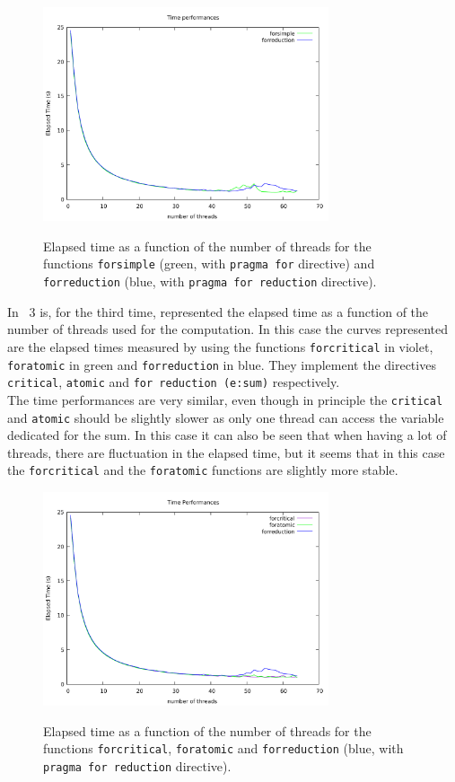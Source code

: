\documentclass[11pt,a4paper]{article}
\begin{document}
\begin{figure}[h!]
	\centering
	\includegraphics[width=0.75\textwidth]{../Images/Performance3.pdf}
	\label{fig:compare}
	\cprotect\caption{Elapsed time as a function of the number of threads for the functions \verb+forsimple+ (green, with \verb+pragma for+ directive) and \verb+forreduction+ (blue, with \verb+pragma for reduction+ directive).}
\end{figure}

\par In \figurename~3 is, for the third time, represented the elapsed time as a function of the number of threads used for the computation.
In this case the curves represented are the elapsed times measured by using the functions \verb+forcritical+ in violet, \verb+foratomic+ in green and \verb+forreduction+ in blue.
They implement the directives \verb+critical+, \verb+atomic+ and \verb+for reduction (e:sum)+ respectively.\\
The time performances are very similar, even though in principle the \verb+critical+ and \verb+atomic+ should be slightly slower as only one thread can access the variable dedicated for the sum.
In this case it can also be seen that when having a lot of threads, there are fluctuation in the elapsed time, but it seems that in this case the \verb+forcritical+ and the \verb+foratomic+ functions are slightly more stable.

\begin{figure}[h!]
	\centering
	\includegraphics[width=0.75\textwidth]{../Images/Performance2.pdf}
	\label{fig:race}
	\cprotect\caption{Elapsed time as a function of the number of threads for the functions \verb+forcritical+, \verb+foratomic+ and \verb+forreduction+ (blue, with \verb+pragma for reduction+ directive).}
\end{figure}
\end{document}
